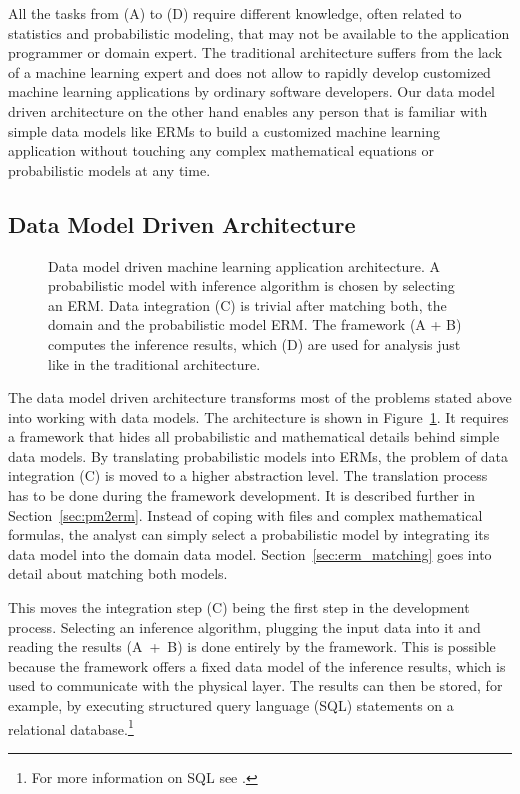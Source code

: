 All the tasks from (A) to (D) require different knowledge, often related to statistics and probabilistic modeling, that may not be available to the application programmer or domain expert. The traditional architecture suffers from the lack of a machine learning expert and does not allow to rapidly develop customized machine learning applications by ordinary software developers. Our data model driven architecture on the other hand enables any person that is familiar with simple data models like ERMs to build a customized machine learning application without touching any complex mathematical equations or probabilistic models at any time.

\newpage %

\subsection{Data Model Driven Architecture}

\begin{figure}
\centering
\scalebox{\tikzScale}{\adjustTikzSize }
\caption[Data model driven machine learning application architecture]{Data model driven machine learning application architecture. A probabilistic model with inference algorithm is chosen by selecting an ERM. Data integration (C) is trivial after matching both, the domain and the probabilistic model ERM. The framework (A + B) computes the inference results, which (D) are used for analysis just like in the traditional architecture.}\label{fig:ml-application-architecture-dm}
\end{figure}

The data model driven architecture transforms most of the problems stated above into working with data models. The architecture is shown in Figure~\ref{fig:ml-application-architecture-dm}. It requires a framework that hides all probabilistic and mathematical details behind simple data models. By translating probabilistic models into ERMs, the problem of data integration (C) is moved to a higher abstraction level. The translation process has to be done during the framework development. It is described further in Section~\ref{sec:pm2erm}. Instead of coping with files and complex mathematical formulas, the analyst can simply select a probabilistic model by integrating its data model into the domain data model. Section~\ref{sec:erm_matching} goes into detail about matching both models.

This moves the integration step (C) being the first step in the development process. Selecting an inference algorithm, plugging the input data into it and reading the results (A~+~B) is done entirely by the framework. This is possible because the framework offers a fixed data model of the inference results, which is used to communicate with the physical layer. The results can then be stored, for example, by executing structured query language (SQL) statements on a relational database.\footnote{For more information on SQL see \textcite{date1987guide}.}

